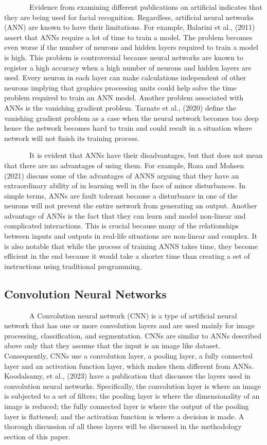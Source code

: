 \documentclass[
  12pt,
]{report}
\begin{document}
~~~~~~~Evidence from examining different publications on artificial
indicates that they are being used for facial recognition. Regardless,
artificial neural networks (ANN) are known to have their limitations.
For example, Balarini et al., (2011) assert that ANNs require a lot of
time to train a model. The problem becomes even worse if the number of
neurons and hidden layers required to train a model is high. This
problem is controversial because neural networks are known to register a
high accuracy when a high number of neurons and hidden layers are used.
Every neuron in each layer can make calculations independent of other
neurons implying that graphics processing units could help solve the
time problem required to train an ANN model. Another problem associated
with ANNs is the vanishing gradient problem. Tarnate et al., (2020)
define the vanishing gradient problem as a case when the neural network
becomes too deep hence the network becomes hard to train and could
result in a situation where network will not finish its training
process.

~~~~~~~It is evident that ANNs have their disadvantages, but that does
not mean that there are no advantages of using them. For example, Roza
and Mohsen (2021) discuss some of the advantages of ANNS arguing that
they have an extraordinary ability of in learning well in the face of
minor disturbances. In simple terms, ANNs are fault tolerant because a
disturbance in one of the neurons will not prevent the entire network
from generating an output. Another advantage of ANNs is the fact that
they can learn and model non-linear and complicated interactions. This
is crucial because many of the relationships between inputs and outputs
in real-life situations are non-linear and complex. It is also notable
that while the process of training ANNS takes time, they become
efficient in the end because it would take a shorter time than creating
a set of instructions using traditional programming.

\subsection{Convolution Neural
Networks}\label{convolution-neural-networks}

~~~~~~~A Convolution neural network (CNN) is a type of artificial neural
network that has one or more convolution layers and are used mainly for
image processing, classification, and segmentation. CNNs are similar to
ANNs described above only that they assume that the input is an image
like dataset. Consequently, CNNs use a convolution layer, a pooling
layer, a fully connected layer and an activation function layer, which
makes them different from ANNs. Koodalsamy, et al., (2023) have a
publication that discusses the layers used in convolution neural
networks. Specifically, the convolution layer is where an image is
subjected to a set of filters; the pooling layer is where the
dimensionality of an image is reduced; the fully connected layer is
where the output of the pooling layer is flattened; and the activation
function is where a decision is made. A thorough discussion of all these
layers will be discussed in the methodology section of this paper.
\end{document}
